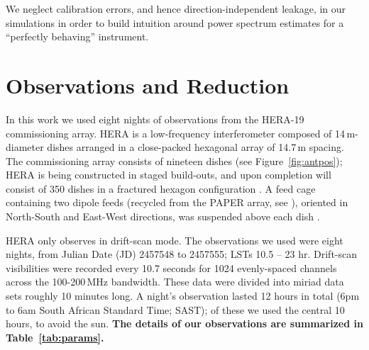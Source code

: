 \documentclass[twocolumn, trackchanges]{aastex61}
\newcommand{\edited}[1]{{\bf \color{red} #1}}
\begin{document}
We neglect calibration errors, and hence direction-independent leakage, in our simulations in order to build intuition around power spectrum estimates for a ``perfectly behaving'' instrument.  

\section{Observations and Reduction}
\label{sec:obs}

In this work we used eight nights of observations from the HERA-19 commissioning array. HERA is a low-frequency interferometer composed of 14\,m-diameter dishes arranged in a close-packed hexagonal array of 14.7\,m spacing. The commissioning array consists of nineteen dishes (see Figure~\ref{fig:antpos}); HERA is being constructed in staged build-outs, and upon completion will consist of 350 dishes in a fractured hexagon configuration \citep[see][]{DillonParsons16, deBoer17}. A feed cage containing two dipole feeds (recycled from the PAPER array, see \citealt{Parsons.10}), oriented in North-South and East-West directions, was suspended above each dish \citep{Neben.16,Ewall-Wice.16,Thyagarajan.16}.

HERA only observes in drift-scan mode. The observations we used were eight nights, from Julian Date (JD) 2457548 to 2457555; LSTs 10.5 -- 23 hr. Drift-scan visibilities were recorded every 10.7 seconds for 1024 evenly-spaced channels across the 100-200\,MHz bandwidth. These data were divided into {\sc miriad} data sets roughly 10 minutes long. A night's observation lasted 12 hours in total (6pm to 6am South African Standard Time; SAST); of these we used the central 10 hours, to avoid the sun. \edited{The details of our observations are summarized in Table~\ref{tab:params}.}
\end{document}
